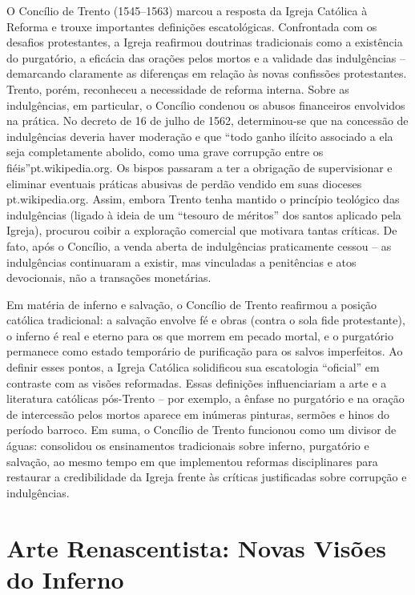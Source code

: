 O Concílio de Trento (1545--1563) marcou a resposta da Igreja Católica à Reforma e trouxe importantes definições escatológicas. Confrontada com os desafios protestantes, a Igreja reafirmou doutrinas tradicionais como a existência do purgatório, a eficácia das orações pelos mortos e a validade das indulgências -- demarcando claramente as diferenças em relação às novas confissões protestantes. Trento, porém, reconheceu a necessidade de reforma interna. Sobre as indulgências, em particular, o Concílio condenou os abusos financeiros envolvidos na prática. No decreto de 16 de julho de 1562, determinou-se que na concessão de indulgências deveria haver moderação e que “todo ganho ilícito associado a ela seja completamente abolido, como uma grave corrupção entre os fiéis”pt.wikipedia.org. Os bispos passaram a ter a obrigação de supervisionar e eliminar eventuais práticas abusivas de perdão vendido em suas dioceses pt.wikipedia.org. Assim, embora Trento tenha mantido o princípio teológico das indulgências (ligado à ideia de um “tesouro de méritos” dos santos aplicado pela Igreja), procurou coibir a exploração comercial que motivara tantas críticas. De fato, após o Concílio, a venda aberta de indulgências praticamente cessou -- as indulgências continuaram a existir, mas vinculadas a penitências e atos devocionais, não a transações monetárias.

Em matéria de inferno e salvação, o Concílio de Trento reafirmou a posição católica tradicional: a salvação envolve fé e obras (contra o sola fide protestante), o inferno é real e eterno para os que morrem em pecado mortal, e o purgatório permanece como estado temporário de purificação para os salvos imperfeitos. Ao definir esses pontos, a Igreja Católica solidificou sua escatologia “oficial” em contraste com as visões reformadas. Essas definições influenciariam a arte e a literatura católicas pós-Trento -- por exemplo, a ênfase no purgatório e na oração de intercessão pelos mortos aparece em inúmeras pinturas, sermões e hinos do período barroco. Em suma, o Concílio de Trento funcionou como um divisor de águas: consolidou os ensinamentos tradicionais sobre inferno, purgatório e salvação, ao mesmo tempo em que implementou reformas disciplinares para restaurar a credibilidade da Igreja frente às críticas justificadas sobre corrupção e indulgências.


\section{Arte Renascentista: Novas Visões do Inferno}


